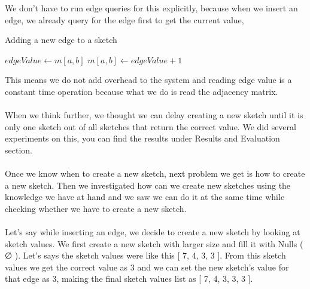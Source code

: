 \documentclass[12pt]{report}
\numberwithin{figure}{section}
\numberwithin{table}{section}
\begin{document}
We don't have to run edge queries for this explicitly, because when we insert an edge, we already query for the edge first to get the current value, 

\begin{algorithm}
\caption{Adding a new edge to a sketch}
\label{alg1}
\begin{algorithmic}
\STATE
\STATE $edgeValue \leftarrow m[a,b] $ 
\STATE $m[a,b] \leftarrow edgeValue + 1 $ 
\STATE
\end{algorithmic}
\end{algorithm}

This means we do not add overhead to the system and reading edge value is a constant time operation because what we do is read the adjacency matrix. 

\paragraph{}

When we think further, we thought we can delay creating a new sketch until it is only one sketch out of all sketches that return the correct value. We did several experiments on this, you can find the results under Results and Evaluation section.

\paragraph{}

Once we know when to create a new sketch, next problem we get is how to create a new sketch. Then we investigated how can we create new sketches using the knowledge we have at hand and we saw we can do it at the same time while checking whether we have to create a new sketch.

\paragraph{}

Let’s say while inserting an edge,  we decide to create a new sketch by looking at sketch values. We first create a new sketch with larger size and fill it with Nulls ( ∅ ). Let’s says  the sketch values were like this [ 7, 4, 3, 3 ]. From this sketch values we get the correct value as 3 and we can set the new sketch's value for that edge as 3, making the final sketch values list as  [ 7, 4, 3, 3, 3 ]. 

\paragraph{}
\end{document}
